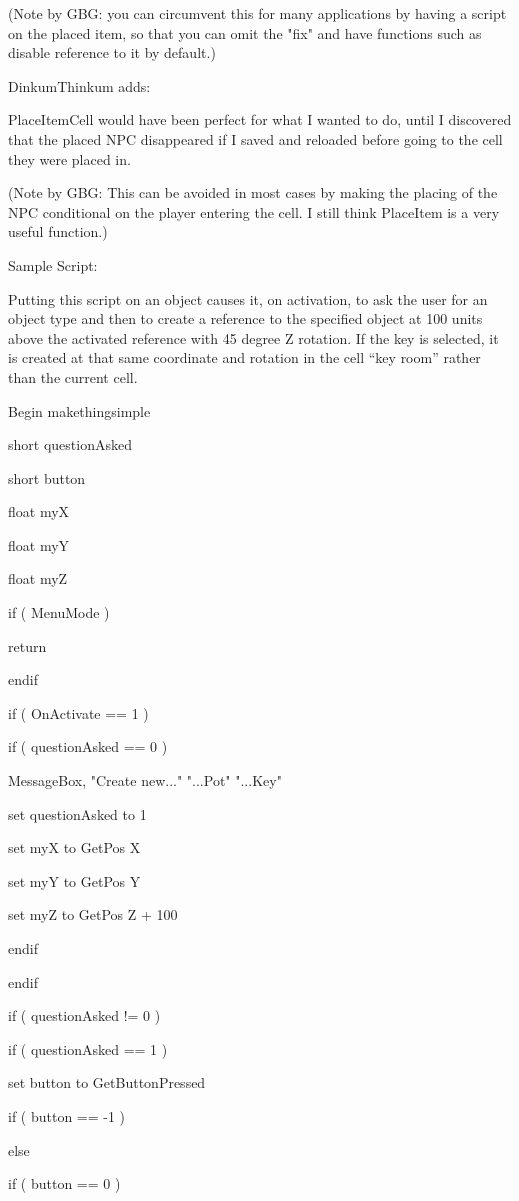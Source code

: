 \documentclass[
]{article}
\begin{document}
(Note by GBG: you can circumvent this for many applications by having a
script on the placed item, so that you can omit the "fix" and have
functions such as disable reference to it by default.)

DinkumThinkum adds:

PlaceItemCell would have been perfect for what I wanted to do, until I
discovered that the placed NPC disappeared if I saved and reloaded
before going to the cell they were placed in.

(Note by GBG: This can be avoided in most cases by making the placing of
the NPC conditional on the player entering the cell. I still think
PlaceItem is a very useful function.)

Sample Script:

Putting this script on an object causes it, on activation, to ask the
user for an object type and then to create a reference to the specified
object at 100 units above the activated reference with 45 degree Z
rotation. If the key is selected, it is created at that same coordinate
and rotation in the cell ``key room'' rather than the current cell.

Begin makethingsimple

short questionAsked

short button

float myX

float myY

float myZ

if ( MenuMode )

return

endif

if ( OnActivate == 1 )

if ( questionAsked == 0 )

MessageBox, "Create new..." "...Pot" "...Key"

set questionAsked to 1

set myX to GetPos X

set myY to GetPos Y

set myZ to GetPos Z + 100

endif

endif

if ( questionAsked != 0 )

if ( questionAsked == 1 )

set button to GetButtonPressed

if ( button == -1 )

else

if ( button == 0 )
\end{document}
